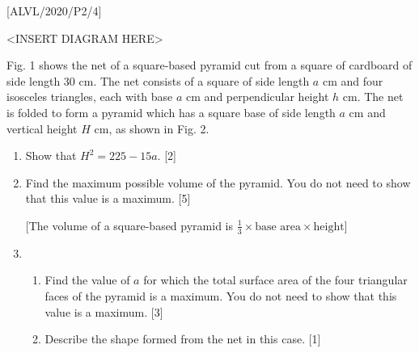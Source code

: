 \item {[}ALVL/2020/P2/4{]}
\noindent \begin{center}
\textless INSERT DIAGRAM HERE\textgreater{}
\par\end{center}

Fig. 1 shows the net of a square-based pyramid cut from a square of
cardboard of side length 30 cm. The net consists of a square of side
length $a$ cm and four isosceles triangles, each with base $a$ cm
and perpendicular height $h$ cm. The net is folded to form a pyramid
which has a square base of side length $a$ cm and vertical height
$H$ cm, as shown in Fig. 2. 
\begin{enumerate}
\item Show that $H^{2}=225-15a$.\hfill{} {[}2{]}
\item Find the maximum possible volume of the pyramid. You do not need to
show that this value is a maximum.\hfill{} {[}5{]}

{[}The volume of a square-based pyramid is $\frac{1}{3}\times\text{base area}\times\text{height}${]}
\item {}
\begin{enumerate}
\item Find the value of $a$ for which the total surface area of the four
triangular faces of the pyramid is a maximum. You do not need to show
that this value is a maximum.\hfill{} {[}3{]}
\item Describe the shape formed from the net in this case.\hfill{} {[}1{]}
\end{enumerate}
\end{enumerate}
